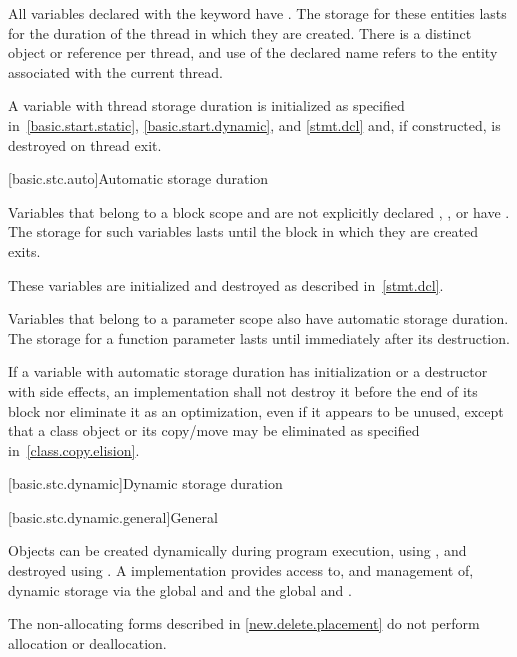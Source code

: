 \pnum
All variables declared with the  keyword have
.
The storage for these entities lasts for the duration of
the thread in which they are created. There is a distinct object or reference
per thread, and use of the declared name refers to the entity associated with
the current thread.

\pnum
\begin{note}
A variable with thread storage duration is initialized as specified
in~\ref{basic.start.static}, \ref{basic.start.dynamic}, and \ref{stmt.dcl}
and, if constructed, is destroyed on thread exit.
\end{note}

[basic.stc.auto]{Automatic storage duration}

\pnum
{}%
Variables that belong to a block scope and are
not explicitly declared , , or  have
. The storage
for such variables lasts until the block in which they are created exits.
\begin{note}
These variables are initialized and destroyed as described in~\ref{stmt.dcl}.
\end{note}
Variables that belong to a parameter scope also have automatic storage duration.
The storage for a function parameter lasts until
immediately after its destruction.

\pnum
If a variable with automatic storage duration has initialization or a destructor with side
effects, an implementation shall not destroy it before the end of its block
nor eliminate it as an optimization, even if it appears to be
unused, except that a class object or its copy/move may be eliminated as
specified in~\ref{class.copy.elision}.

[basic.stc.dynamic]{Dynamic storage duration}%

[basic.stc.dynamic.general]{General}%

\pnum
Objects can be created dynamically during program
execution, using
%
, and destroyed using
%
. A \Cpp{} implementation
provides access to, and management of, dynamic storage via
the global 
 and
 and
the global 
 and
.
\begin{note}
The non-allocating forms described in \ref{new.delete.placement}
do not perform allocation or deallocation.
\end{note}

